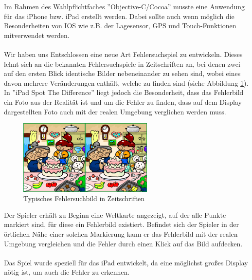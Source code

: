 Im Rahmen des Wahlpflichtfaches ''Objective-C/Cocoa'' musste eine Anwendung für das iPhone bzw. iPad erstellt werden. Dabei sollte auch wenn möglich die Besonderheiten von IOS wie z.B. der Lagesensor, GPS und Touch-Funktionen mitverwendet werden.\\
\\
Wir haben uns Entschlossen eine neue Art Fehlersuchspiel zu entwickeln. Dieses lehnt sich an die bekannten Fehlersuchspiele in Zeitschriften an, bei denen zwei auf den ersten Blick identische Bilder nebeneinander zu sehen sind, wobei eines davon mehrere Veränderungen enthält, welche zu finden sind (siehe Abbildung \ref{fehlersuchspiel}). In ''iPad Spot The Difference'' liegt jedoch die Besonderheit, dass das Fehlerbild ein Foto aus der Realität ist und um die Fehler zu finden, dass auf dem Display dargestellten Foto auch mit der realen Umgebung verglichen werden muss.

\begin{figure}[H]
  \centering
  \includegraphics[width=0.6\textwidth]{bilder/Spot_the_difference.png}
  \caption{Typisches Fehlersuchbild in Zeitschriften}
  \label{fehlersuchspiel}
\end{figure}

Der Spieler erhält zu Beginn eine Weltkarte angezeigt, auf der alle Punkte markiert sind, für diese ein Fehlerbild existiert. Befindet sich der Spieler in der örtlichen Nähe einer solchen Markierung kann er das Fehlerbild mit der realen Umgebung vergleichen und die Fehler durch einen Klick auf das Bild aufdecken.\\
\\
Das Spiel wurde speziell für das iPad entwickelt, da eine möglichst großes Display nötig ist, um auch die Fehler zu erkennen.